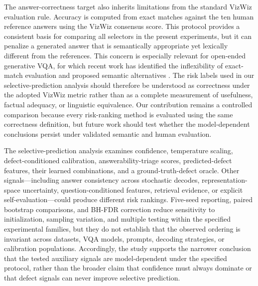 \documentclass{ieeeaccess}
\begin{document}
The answer-correctness target also inherits limitations from the
standard VizWiz evaluation rule. Accuracy is computed from exact
matches against the ten human reference answers using the
VizWiz consensus score. This protocol provides a consistent basis
for comparing all selectors in the present experiments, but it can
penalize a generated answer that is semantically appropriate yet
lexically different from the references. This concern is especially
relevant for open-ended generative VQA, for which recent work has
identified the inflexibility of exact-match evaluation and proposed
semantic alternatives \cite{ji2024flexible}. The risk labels used in
our selective-prediction analysis should therefore be understood
as correctness under the adopted VizWiz metric rather than as a
complete measurement of usefulness, factual adequacy, or
linguistic equivalence. Our contribution remains a controlled
comparison because every risk-ranking method is evaluated using
the same correctness definition, but future work should test
whether the model-dependent conclusions persist under validated
semantic and human evaluation.

The selective-prediction analysis examines confidence,
temperature scaling, defect-conditioned calibration,
answerability-triage scores, predicted-defect features, their
learned combinations, and a ground-truth-defect oracle.
Other signals---including answer consistency across stochastic
decodes, representation-space uncertainty, question-conditioned
features, retrieval evidence, or explicit self-evaluation---could
produce different risk rankings. Five-seed reporting, paired
bootstrap comparisons, and BH-FDR correction reduce sensitivity
to initialization, sampling variation, and multiple testing within
the specified experimental families, but they do not establish
that the observed ordering is invariant across datasets, VQA
models, prompts, decoding strategies, or calibration populations.
Accordingly, the study supports the narrower conclusion that the
tested auxiliary signals are model-dependent under the specified
protocol, rather than the broader claim that confidence must
always dominate or that defect signals can never improve
selective prediction.
\end{document}
